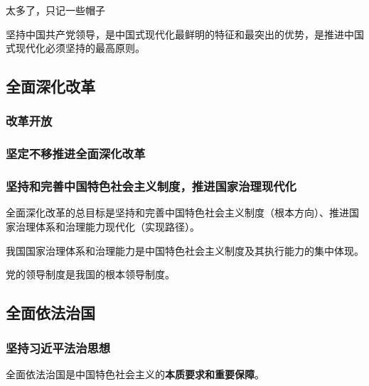 \documentclass[12pt, a4paper, oneside]{ctexart}
\begin{document}
太多了，只记一些帽子

坚持中国共产党领导，是中国式现代化最鲜明的特征和最突出的优势，是推进中国式现代化必须坚持的最高原则。

\subsection{全面深化改革}

\subsubsection{改革开放}

\subsubsection{坚定不移推进全面深化改革}

\subsubsection{坚持和完善中国特色社会主义制度，推进国家治理现代化}

全面深化改革的总目标是坚持和完善中国特色社会主义制度（根本方向）、推进国家治理体系和治理能力现代化（实现路径）。

我国国家治理体系和治理能力是中国特色社会主义制度及其执行能力的集中体现。

党的领导制度是我国的根本领导制度。

\subsection{全面依法治国}

\subsubsection{坚持习近平法治思想}

全面依法治国是中国特色社会主义的\textbf{本质要求和重要保障}。
\end{document}
